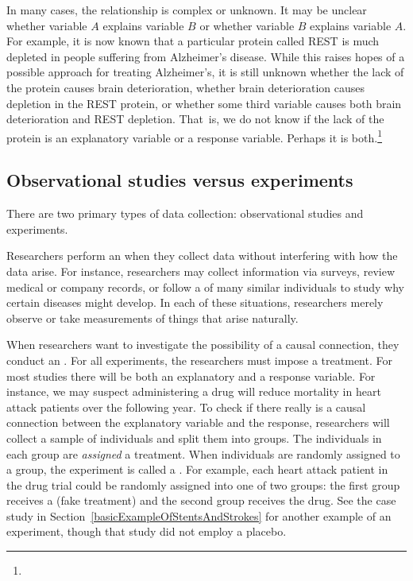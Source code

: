 In many cases, the relationship is complex or unknown. It may be unclear whether variable $A$ explains variable $B$ or whether variable $B$ explains variable $A$. For example, it is now known that a particular protein called REST is much depleted in people suffering from Alzheimer's disease. While this raises hopes of a possible approach for treating Alzheimer's, it is still unknown whether the lack of the protein causes brain deterioration, whether brain deterioration causes depletion in the REST protein, or whether some third variable causes both brain deterioration and REST depletion. That~is, we do not know if the lack of the protein is an explanatory variable or a response variable. Perhaps it is both.\footnote{}



\D{\newpage}
\subsection{Observational studies versus experiments}

\noindent There are two primary types of data collection: observational studies and experiments.

Researchers perform an  when they collect data without interfering with how the data arise. For instance, researchers may collect information via surveys, review medical or company records, or follow a  of many similar individuals to study why certain diseases might develop. In each of these situations, researchers merely observe or take measurements of things that arise naturally.

When researchers want to investigate the possibility of a causal connection, they conduct an . For all experiments, the researchers must impose a treatment. For most studies there will be both an explanatory and a response variable. For instance, we may suspect administering a drug will reduce mortality in heart attack patients over the following year. To check if there really is a causal connection between the explanatory variable and the response, researchers will collect a sample of individuals and split them into groups. The individuals in each group are \emph{assigned} a treatment. When individuals are randomly assigned to a group, the experiment is called a . For example, each heart attack patient in the drug trial could be randomly assigned into one of two groups: the first group receives a  (fake treatment) and the second group receives the drug. See the case study in Section~\ref{basicExampleOfStentsAndStrokes} for another example of an experiment, though that study did not employ a placebo.

